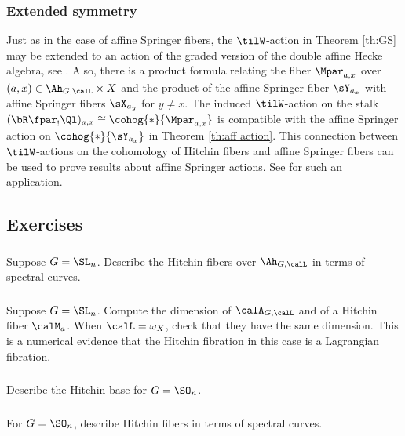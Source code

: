 \subsubsection{Extended symmetry} Just as in the case of affine Springer fibers, the $\tilW$-action in Theorem \ref{th:GS} may be extended to an action of the graded version of the double affine Hecke algebra, see \cite[Th 6.1.6]{GS}. Also, there is a product formula relating the fiber $\Mpar_{a,x}$ over $(a,x)\in\Ah_{G,\calL}\times X$ and the product of the affine Springer fiber $\sY_{a_{x}}$ with affine Springer fibers $\sX_{a_{y}}$ for $y\neq x$.  The induced $\tilW$-action on the stalk $(\bR\fpar_{!}\Ql)_{a,x}\cong\cohog{*}{\Mpar_{a,x}}$ is compatible with the affine Springer action on $\cohog{*}{\sY_{a_{x}}}$ in Theorem \ref{th:aff action}. This connection between $\tilW$-actions on the cohomology of Hitchin fibers and affine Springer fibers can be used to prove results about affine Springer actions. See \cite{YSph} for such an application.




\subsection{Exercises}

\subsubsection{} Suppose $G=\SL_{n}$. Describe the Hitchin fibers over $\Ah_{G,\calL}$ in terms of spectral curves.

\subsubsection{} Suppose $G=\SL_{n}$. Compute the dimension of $\calA_{G,\calL}$ and of a Hitchin fiber $\calM_{a}$. When $\calL=\omega_{X}$, check that they have the same dimension. This is a numerical evidence that the Hitchin fibration in this case is a Lagrangian fibration.


\subsubsection{} Describe the Hitchin base for $G=\SO_{n}$.

\subsubsection{} For $G=\SO_{n}$, describe Hitchin fibers in terms of spectral curves.

